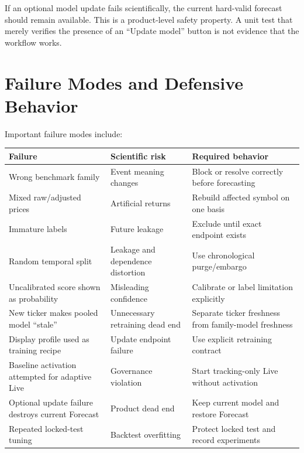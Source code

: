 \documentclass[11pt]{article}
\begin{document}
If an optional model update fails scientifically, the current hard-valid forecast should remain available. This is a product-level safety property. A unit test that merely verifies the presence of an ``Update model'' button is not evidence that the workflow works.

\section{Failure Modes and Defensive Behavior}
Important failure modes include:
\begin{longtable}{p{}p{}p{}}
\toprule
Failure & Scientific risk & Required behavior\\
\midrule
\endhead
Wrong benchmark family & Event meaning changes & Block or resolve correctly before forecasting\\
Mixed raw/adjusted prices & Artificial returns & Rebuild affected symbol on one basis\\
Immature labels & Future leakage & Exclude until exact endpoint exists\\
Random temporal split & Leakage and dependence distortion & Use chronological purge/embargo\\
Uncalibrated score shown as probability & Misleading confidence & Calibrate or label limitation explicitly\\
New ticker makes pooled model ``stale'' & Unnecessary retraining dead end & Separate ticker freshness from family-model freshness\\
Display profile used as training recipe & Update endpoint failure & Use explicit retraining contract\\
Baseline activation attempted for adaptive Live & Governance violation & Start tracking-only Live without activation\\
Optional update failure destroys current Forecast & Product dead end & Keep current model and restore Forecast\\
Repeated locked-test tuning & Backtest overfitting & Protect locked test and record experiments\\
\bottomrule
\end{longtable}
\end{document}
